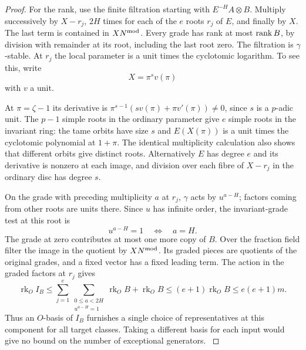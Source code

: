 \begin{proof}
For the rank, use the finite filtration starting with \(E^{-H}A\otimes B\).
Multiply successively by \(X-r_j\), \(2H\) times for each of the
\(e\) roots \(r_j\) of \(E\), and finally by \(X\). The last term
is contained in \(XN^{\rm mod}\). Every grade has rank at most
\({\rm rank}\,B\), by division with remainder at its root, including
the last root zero. The filtration is \(\gamma\)-stable. At \(r_j\)
the local parameter is a unit times the cyclotomic logarithm. To see
this, write
\[
 X=\pi^s v(\pi)
\]
with \(v\) a unit.

At
\(\pi=\zeta-1\) its derivative is
\(\pi^{s-1}(sv(\pi)+\pi v'(\pi))\ne0\), since \(s\) is a \(p\)-adic
unit. The \(p-1\) simple roots in the ordinary parameter give \(e\)
simple roots in the invariant ring: the tame orbits have size \(s\)
and \(E(X(\pi))\) is a unit times the cyclotomic polynomial at
\(1+\pi\). The identical multiplicity calculation also shows that
different orbits give distinct roots. Alternatively \(E\) has
degree \(e\) and its derivative is nonzero at each image, and division
over each fibre of \(X-r_j\) in the ordinary disc has degree \(s\).

On the grade with preceding multiplicity \(a\) at \(r_j\), \(\gamma\)
acts by \(u^{a-H}\); factors coming from other roots are units there.
Since \(u\) has infinite order, the invariant-grade test at this root is
\[
 u^{a-H}=1\quad\Longleftrightarrow\quad a=H.
\]
The
grade at zero contributes at most one more copy of \(B\).
Over the fraction field filter the image in the quotient by
\(XN^{\rm mod}\). Its graded pieces are quotients of the original
grades, and a fixed vector has a fixed leading term. The action in the graded factors at \(r_j\) gives
\[
 \operatorname{rk}_O I_B
 \le \sum_{j=1}^{e}\sum_{\substack{0\le a<2H\\u^{a-H}=1}}
           \operatorname{rk}_O B+\operatorname{rk}_O B
 \le (e+1)\operatorname{rk}_O B\le e(e+1)m .
\]
Thus an \(O\)-basis of \(I_B\) furnishes a single choice of
representatives at this component for all target classes. Taking a different basis for each input
would give no bound on the number of exceptional generators.
\label{cor:row-coordinates-1}
\end{proof}
